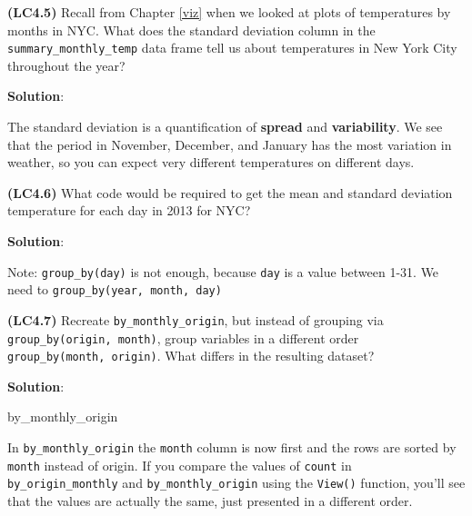 \documentclass[12pt, krantz2,]{krantz}
\makeatletter
\newenvironment{Shaded}{\begin{snugshade}}{\end{snugshade}}
\newcommand{\DataTypeTok}[1]{\textcolor[rgb]{0.27,0.27,0.27}{#1}}
\newcommand{\KeywordTok}[1]{\textcolor[rgb]{0.27,0.27,0.27}{\textbf{#1}}}
\newcommand{\NormalTok}[1]{#1}
\newcommand{\OperatorTok}[1]{\textcolor[rgb]{0.43,0.43,0.43}{\textbf{#1}}}
\newcommand{\OtherTok}[1]{\textcolor[rgb]{0.37,0.37,0.37}{#1}}
\newcommand{\StringTok}[1]{\textcolor[rgb]{0.5,0.5,0.5}{#1}}
\newenvironment{kframe}{%
\medskip{}
\setlength{\fboxsep}{.8em}
 \def\at@end@of@kframe{}%
 \ifinner\ifhmode%
  \def\at@end@of@kframe{\end{minipage}}%
  \begin{minipage}{\columnwidth}%
 \fi\fi%
 \def\FrameCommand##1{\hskip\@totalleftmargin \hskip-\fboxsep
 \colorbox{shadecolor}{##1}\hskip-\fboxsep
     \hskip-\linewidth \hskip-\@totalleftmargin \hskip\columnwidth}%
 \MakeFramed {\advance\hsize-\width
   \@totalleftmargin\z@ \linewidth\hsize
   \@setminipage}}%
 {\par\unskip\endMakeFramed%
 \at@end@of@kframe}
\renewenvironment{Shaded}{\begin{kframe}}{\end{kframe}}
\makeatother
\begin{document}
\textbf{(LC4.5)} Recall from Chapter \ref{viz} when we looked at plots of temperatures by months in NYC. What does the standard deviation column in the \texttt{summary\_monthly\_temp} data frame tell us about temperatures in New York City throughout the year?

\textbf{Solution}:

The standard deviation is a quantification of \textbf{spread} and \textbf{variability}. We
see that the period in November, December, and January has the most variation in
weather, so you can expect very different temperatures on different days.

\textbf{(LC4.6)} What code would be required to get the mean and standard deviation temperature for each day in 2013 for NYC?

\textbf{Solution}:

Note: \texttt{group\_by(day)} is not enough, because \texttt{day} is a value between 1-31. We need to \texttt{group\_by(year,\ month,\ day)}

\begin{Shaded}
\end{Shaded}

\textbf{(LC4.7)} Recreate \texttt{by\_monthly\_origin}, but instead of grouping via \texttt{group\_by(origin,\ month)}, group variables in a different order \texttt{group\_by(month,\ origin)}. What differs in the resulting dataset?

\textbf{Solution}:

\begin{Shaded}
\begin{Highlighting}[]
\NormalTok{by_monthly_origin}
\end{Highlighting}
\end{Shaded}

In \texttt{by\_monthly\_origin} the \texttt{month} column is now first and the rows are sorted by \texttt{month} instead of origin. If you compare the values of \texttt{count} in \texttt{by\_origin\_monthly} and \texttt{by\_monthly\_origin} using the \texttt{View()} function, you'll see that the values are actually the same, just presented in a different order.
\end{document}
